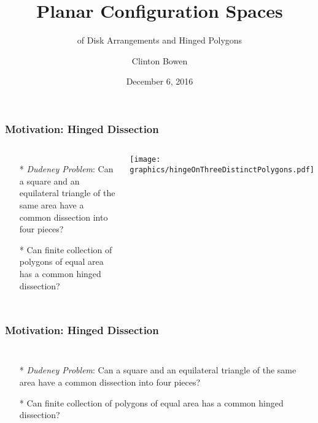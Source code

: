 \documentclass{beamer}
\title[Planar Configuration Spaces]{Planar Configuration Spaces }
\subtitle{of Disk Arrangements and Hinged Polygons}
\author{Clinton Bowen}
\institute
{
  Cal State Northridge
}
\date
{December 6, 2016}
\begin{document}
\frame{\titlepage}

\begin{frame}\frametitle{Motivation: Hinged Dissection}
    \begin{columns}[c]
        \begin{itemize}
            \item[*] \textit{Dudeney Problem}: Can a square and an equilateral triangle of the same area have a common dissection into four pieces?
            \item[*]  Can finite collection of polygons of equal area has a common hinged dissection?
        \end{itemize}
        \begin{minipage}{\linewidth}
            \begin{center}
            \texttt{[image: graphics/hingeOnThreeDistinctPolygons.pdf]}
            \label{gfx:hingeOnThreeDistinctPolygons.pdf}
            \end{center}
        \end{minipage}
    \end{columns}
\end{frame}

\begin{frame}\frametitle{Motivation: Hinged Dissection}
    \begin{columns}[c]
        \begin{itemize}
            \item[*] \textit{Dudeney Problem}: Can a square and an equilateral triangle of the same area have a common dissection into four pieces?
            \item[*]  Can finite collection of polygons of equal area has a common hinged dissection?
        \end{itemize}
  \begin{minipage}{\linewidth}
    \begin{center}
    \end{center}
  \end{minipage}
  \end{columns}
\end{frame}
\end{document}
